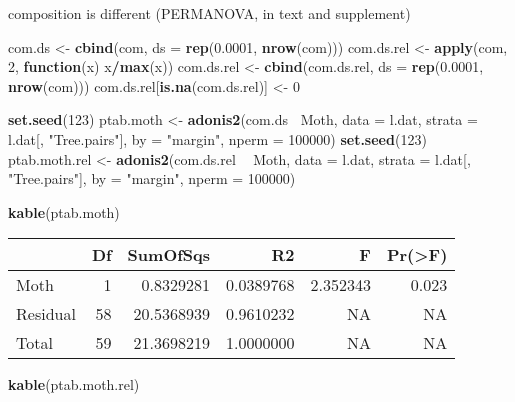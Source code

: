 \documentclass[]{article}
\newenvironment{Shaded}{\begin{snugshade}}{\end{snugshade}}
\newcommand{\KeywordTok}[1]{\textcolor[rgb]{0.13,0.29,0.53}{\textbf{#1}}}
\newcommand{\DataTypeTok}[1]{\textcolor[rgb]{0.13,0.29,0.53}{#1}}
\newcommand{\DecValTok}[1]{\textcolor[rgb]{0.00,0.00,0.81}{#1}}
\newcommand{\FloatTok}[1]{\textcolor[rgb]{0.00,0.00,0.81}{#1}}
\newcommand{\StringTok}[1]{\textcolor[rgb]{0.31,0.60,0.02}{#1}}
\newcommand{\ControlFlowTok}[1]{\textcolor[rgb]{0.13,0.29,0.53}{\textbf{#1}}}
\newcommand{\OperatorTok}[1]{\textcolor[rgb]{0.81,0.36,0.00}{\textbf{#1}}}
\newcommand{\NormalTok}[1]{#1}
\begin{document}
composition is different (PERMANOVA, in text and supplement)

\begin{Shaded}
\begin{Highlighting}[]
\NormalTok{com.ds <-}\StringTok{ }\KeywordTok{cbind}\NormalTok{(com, }\DataTypeTok{ds =} \KeywordTok{rep}\NormalTok{(}\FloatTok{0.0001}\NormalTok{, }\KeywordTok{nrow}\NormalTok{(com)))}
\NormalTok{com.ds.rel <-}\StringTok{ }\KeywordTok{apply}\NormalTok{(com, }\DecValTok{2}\NormalTok{, }\ControlFlowTok{function}\NormalTok{(x) x}\OperatorTok{/}\KeywordTok{max}\NormalTok{(x))}
\NormalTok{com.ds.rel <-}\StringTok{ }\KeywordTok{cbind}\NormalTok{(com.ds.rel, }\DataTypeTok{ds =} \KeywordTok{rep}\NormalTok{(}\FloatTok{0.0001}\NormalTok{, }\KeywordTok{nrow}\NormalTok{(com)))}
\NormalTok{com.ds.rel[}\KeywordTok{is.na}\NormalTok{(com.ds.rel)] <-}\StringTok{ }\DecValTok{0}

\KeywordTok{set.seed}\NormalTok{(}\DecValTok{123}\NormalTok{)}
\NormalTok{ptab.moth <-}\StringTok{ }\KeywordTok{adonis2}\NormalTok{(com.ds}\OperatorTok{~}\StringTok{ }\NormalTok{Moth, }\DataTypeTok{data =}\NormalTok{ l.dat, }
                    \DataTypeTok{strata =}\NormalTok{ l.dat[, }\StringTok{"Tree.pairs"}\NormalTok{], }
                    \DataTypeTok{by =} \StringTok{"margin"}\NormalTok{, }\DataTypeTok{nperm =} \DecValTok{100000}\NormalTok{)}
\KeywordTok{set.seed}\NormalTok{(}\DecValTok{123}\NormalTok{)}
\NormalTok{ptab.moth.rel <-}\StringTok{ }\KeywordTok{adonis2}\NormalTok{(com.ds.rel }\OperatorTok{~}\StringTok{ }\NormalTok{Moth, }\DataTypeTok{data =}\NormalTok{ l.dat, }
                         \DataTypeTok{strata =}\NormalTok{ l.dat[, }\StringTok{"Tree.pairs"}\NormalTok{], }
                         \DataTypeTok{by =} \StringTok{"margin"}\NormalTok{, }\DataTypeTok{nperm =} \DecValTok{100000}\NormalTok{)}

\KeywordTok{kable}\NormalTok{(ptab.moth)}
\end{Highlighting}
\end{Shaded}

\begin{longtable}[]{@{}lrrrrr@{}}
\toprule
& Df & SumOfSqs & R2 & F & Pr(\textgreater{}F)\tabularnewline
\midrule
\endhead
Moth & 1 & 0.8329281 & 0.0389768 & 2.352343 & 0.023\tabularnewline
Residual & 58 & 20.5368939 & 0.9610232 & NA & NA\tabularnewline
Total & 59 & 21.3698219 & 1.0000000 & NA & NA\tabularnewline
\bottomrule
\end{longtable}

\begin{Shaded}
\begin{Highlighting}[]
\KeywordTok{kable}\NormalTok{(ptab.moth.rel)}
\end{Highlighting}
\end{Shaded}
\end{document}
